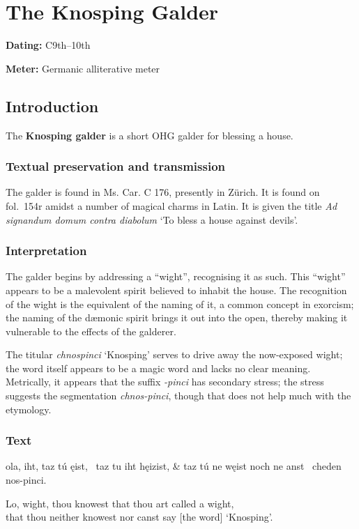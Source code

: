 \section{The Knosping Galder}

\begin{flushright}%
\textbf{Dating:} C9th--10th

\textbf{Meter:} Germanic alliterative meter
\end{flushright}

\subsection{Introduction}

The \textbf{Knosping galder} is a short OHG galder for blessing a house.

\subsubsection{Textual preservation and transmission}

The galder is found in Ms. Car. C 176, presently in Zürich.  It is found on fol.~154r amidst a number of magical charms in Latin.  It is given the title \emph{Ad signandum domum contra diabolum} ‘To bless a house against devils’.

\subsubsection{Interpretation}

The galder begins by addressing a “wight”, recognising it as such.  This “wight” appears to be a malevolent spirit believed to inhabit the house.  The recognition of the wight is the equivalent of the naming of it, a common concept in exorcism; the naming of the dæmonic spirit brings it out into the open, thereby making it vulnerable to the effects of the galderer.

The titular \emph{chnospinci} ‘Knosping’ serves to drive away the now-exposed wight; the word itself appears to be a magic word and lacks no clear meaning.  Metrically, it appears that the suffix \emph{-pinci} has secondary stress; the stress suggests the segmentation \emph{chnos-pinci}, though that does not help much with the etymology.

\sectionline

\subsubsection{Text}

\bvg\bva {}ola, iht, taz tú ęist, \hld\ taz tu iht hęizist, &
taz tú ne węist noch ne anst \hld\ cheden nos-pinci.\eva

\bvb Lo, wight, thou knowest that thou art called a wight, \\
that thou neither knowest nor canst say [the word] ‘Knosping’.\evb\evg

\sectionline

